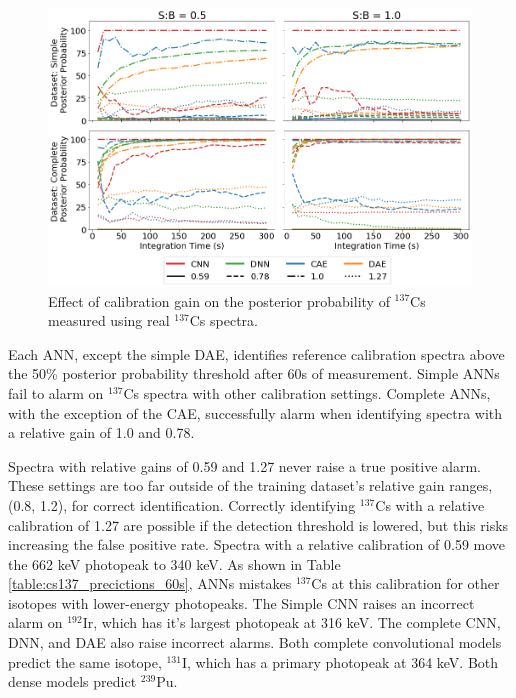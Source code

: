 \begin{figure}[H]
	\centering
	\includegraphics[width=1.0\linewidth]{images/realspectra-cal-cs137}
	\caption{Effect of calibration gain on the posterior probability of $^{137}$Cs measured using real $^{137}$Cs spectra.}
	\label{fig:realspectra-cal-cs137}
\end{figure}

Each ANN, except the simple DAE, identifies reference calibration spectra above the 50\% posterior probability threshold after 60s of measurement. Simple ANNs fail to alarm on $^{137}$Cs spectra with other calibration settings. Complete ANNs, with the exception of the CAE, successfully alarm when identifying spectra with a relative gain of 1.0 and 0.78.

Spectra with relative gains of 0.59 and 1.27 never raise a true positive alarm. These settings are too far outside of the training dataset's relative gain ranges, (0.8, 1.2), for correct identification. Correctly identifying $^{137}$Cs with a relative calibration of 1.27 are possible if the detection threshold is lowered, but this risks increasing the false positive rate. Spectra with a relative calibration of 0.59 move the 662 keV photopeak to 340 keV. As shown in Table \ref{table:cs137_precictions_60s}, ANNs mistakes $^{137}$Cs at this calibration for other isotopes with lower-energy photopeaks. The Simple CNN raises an incorrect alarm on $^{192}$Ir, which has it's largest photopeak at 316 keV. The complete CNN, DNN, and DAE also raise incorrect alarms. Both complete convolutional models predict the same isotope, $^{131}$I, which has a primary photopeak at 364 keV. Both dense models predict $^{239}$Pu.

